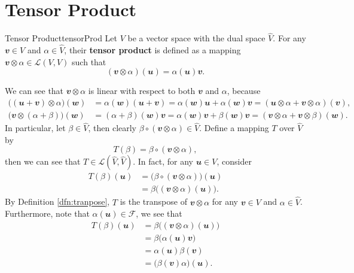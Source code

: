 \documentclass[math, code]{amznotes}
\theoremstyle{remark}
\begin{document}
\section{Tensor Product}
\begin{dfnbox}{Tensor Product}{tensorProd}
    Let $V$ be a vector space with the dual space $\hat{V}$. For any $\mathbfit{v} \in V$ and $\alpha \in \hat{V}$, their {\color{red} \textbf{tensor product}} is defined as a mapping $\mathbfit{v} \otimes \alpha \in \mathcal{L}(V, V)$ such that
    \begin{equation*}
        (\mathbfit{v} \otimes \alpha)(\mathbfit{u}) = \alpha(\mathbfit{u})\mathbfit{v}.
    \end{equation*}
\end{dfnbox}
We can see that $\mathbfit{v} \otimes \alpha$ is linear with respect to both $\mathbfit{v}$ and $\alpha$, because
\begin{align*}
    \bigl((\mathbfit{u + v}) \otimes \alpha\bigr)(\mathbfit{w}) & = \alpha(\mathbfit{w})(\mathbfit{u + v}) = \alpha(\mathbfit{w})\mathbfit{u} + \alpha(\mathbfit{w})\mathbfit{v} = (\mathbfit{u} \otimes \alpha + \mathbfit{v} \otimes \alpha)(\mathbfit{v}), \\
    \bigl(\mathbfit{v} \otimes (\alpha + \beta)\bigr)(\mathbfit{w}) & = (\alpha + \beta)(\mathbfit{w})\mathbfit{v} = \alpha(\mathbfit{w})\mathbfit{v} + \beta(\mathbfit{w})\mathbfit{v} = (\mathbfit{v} \otimes \alpha + \mathbfit{v} \otimes \beta)(\mathbfit{w}).
\end{align*}
In particular, let $\beta \in \hat{V}$, then clearly $\beta \circ (\mathbfit{v} \otimes \alpha) \in \hat{V}$. Define a mapping $T$ over $\hat{V}$ by
\begin{equation*}
    T(\beta) = \beta \circ (\mathbfit{v} \otimes \alpha),
\end{equation*}
then we can see that $T \in \mathcal{L}\left(\hat{V}, \hat{V}\right)$. In fact, for any $\mathbfit{u} \in V$, consider
\begin{align*}
    T(\beta)(\mathbfit{u}) & = \bigl(\beta \circ (\mathbfit{v} \otimes \alpha)\bigr)(\mathbfit{u}) \\
    & = \beta\bigl((\mathbfit{v} \otimes \alpha)(\mathbfit{u})\bigr).
\end{align*}
By Definition \ref{dfn:tranpose}, $T$ is the transpose of $\mathbfit{v} \otimes \alpha$ for any $\mathbfit{v} \in V$ and $\alpha \in \hat{V}$. Furthermore, note that $\alpha(\mathbfit{u}) \in \mathcal{F}$, we see that
\begin{align*}
    T(\beta)(\mathbfit{u}) & = \beta\bigl((\mathbfit{v} \otimes \alpha)(\mathbfit{u})\bigr) \\
    & = \beta\bigl(\alpha(\mathbfit{u})\mathbfit{v}\bigr) \\
    & = \alpha(\mathbfit{u})\beta(\mathbfit{v}) \\
    & = \bigl(\beta(\mathbfit{v})\alpha\bigr)(\mathbfit{u}).
\end{align*}
\end{document}
